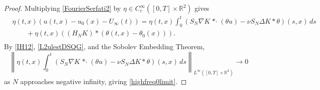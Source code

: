 \documentclass[11pt,reqno,xcolor=svgnames]{amsart}
\def\R{{\mathbb R}}
\theoremstyle{plain}
\theoremstyle{definition}
\theoremstyle{plain}
\theoremstyle{remark}
\newcommand{\stardot}{{\mathop{* \cdot}}}
\begin{document}
\begin{proof}
Multiplying \cref{FourierSerfati2} by $\eta\in C^{\infty}_c([0,T]\times\R^2)$ gives
\begin{equation*}
\begin{split}
&\eta(t,x)(u(t,x) - u_0(x) -U_{\infty}(t)) = \eta(t,x) \int_0^t \left( S_{N}\nabla K \stardot (\theta u) - \nu S_{N}\Delta K \ast \theta\right)(s,x) \, ds  \\
&\qquad + \eta(t,x) ( (H_NK) \ast (\theta(t,x) - \theta_0(x))).  \\
\end{split}
\end{equation*}
By \cref{IH12}, \cref{L2ulestDSQG}, and the Sobolev Embedding Theorem, 
\begin{equation}\label{lowfreqto0uniform}\left \| \eta(t,x) \int_0^t \left( S_{N}\nabla K \stardot (\theta u) - \nu S_{N}\Delta K \ast \theta\right)(s,x) \, ds \right \|_{L^{\infty}([0,T]\times\R^2)} \rightarrow 0
\end{equation} 
as $N$ approaches negative infinity, giving \cref{highfreq0limit}.
\end{proof}
\end{document}
